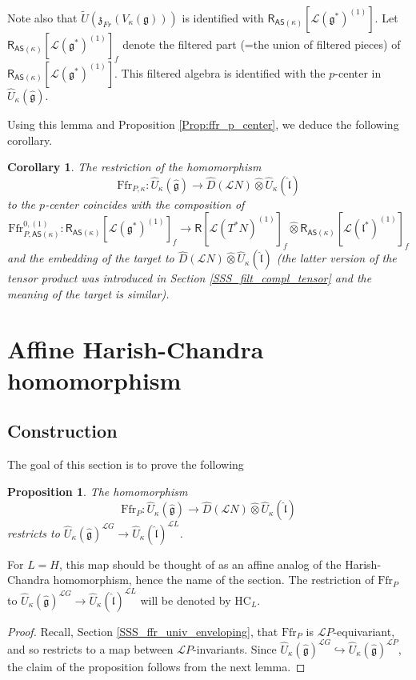 \documentclass{amsart}
\newtheorem{Prop}[Thm]{Proposition}
\newtheorem{Cor}[Thm]{Corollary}
\theoremstyle{definition}
\newcommand{\Ring}{\mathsf{R}}
\newcommand{\g}{\mathfrak{g}}
\newcommand{\HC}{\mathrm{HC}} %
\newcommand{\lf}{\mathfrak{l}}
\newcommand{\Loop}{\mathscr{L}}
\newcommand{\AS}{\mathsf{AS}}
\newcommand{\frz}{\mathfrak{z}}
\newcommand{\Ffr}{\mathrm{{Ffr}}}
\numberwithin{equation}{section}
\begin{document}
Note also that $\widetilde{U}(\frz_{Fr}(V_\kappa(\g)))$ is identified 
with $\Ring_{\AS(\kappa)}[\Loop (\g^*)^{(1)}]$. Let
$\Ring_{\AS(\kappa)}[\Loop (\g^*)^{(1)}]_f$ denote the filtered part (=the union of filtered pieces) of $\Ring_{\AS(\kappa)}[\Loop (\g^*)^{(1)}]$. This filtered algebra is identified with the $p$-center in $\widehat{U}_\kappa(\hat{\g})$.

Using this lemma and Proposition \ref{Prop:ffr_p_center}, we deduce the following corollary.

\begin{Cor}\label{Cor:ffr_p_center}
The restriction of the homomorphism $$\Ffr_{P,\kappa}:\widehat{U}_\kappa(\hat{\g})\rightarrow \widehat{D}(\Loop N)\widehat{\otimes} \widehat{U}_\kappa(\hat{\lf})$$ to 
the $p$-center coincides with the composition
of 
$$\Ffr^{0,(1)}_{P,\AS(\kappa)}:\Ring_{\AS(\kappa)}[\Loop (\g^*)^{(1)}]_f\rightarrow \Ring[\Loop (T^*N)^{(1)}]_f\widehat{\otimes} \Ring_{\AS(\kappa)}[\Loop (\lf^*)^{(1)}]_f$$
and the embedding of the target to $\widehat{D}(\Loop N)\widehat{\otimes} \widehat{U}_\kappa(\hat{\lf})$ (the latter version of the tensor product was introduced in Section \ref{SSS_filt_compl_tensor} and the meaning of the target is similar).
\end{Cor}


\section{Affine Harish-Chandra homomorphism}\label{S_affine_HC}
\subsection{Construction}
The goal of this section is to prove the following 
\begin{Prop}\label{Prop:affine_HC}
The homomorphism 
$$\Ffr_P:\widehat{U}_\kappa(\hat{\g})\rightarrow 
\widehat{D}(\Loop N)\widehat{\otimes}\widehat{U}_\kappa(\hat{\lf})$$
restricts to $\widehat{U}_\kappa(\hat{\g})^{\Loop G}\rightarrow 
\widehat{U}_\kappa(\hat{\lf})^{\Loop L}$. 
\end{Prop}

For $L=H$, this map should be thought of as an affine analog of the Harish-Chandra homomorphism, hence the name of the section. The restriction of $\Ffr_P$ to $\widehat{U}_\kappa(\hat{\g})^{\Loop G}\rightarrow 
\widehat{U}_\kappa(\hat{\lf})^{\Loop L}$ will be denoted by $\HC_L$.

\begin{proof}
Recall, Section \ref{SSS_ffr_univ_enveloping}, that $\Ffr_P$ is $\Loop P$-equivariant, and so restricts to a map between $\Loop P$-invariants. Since 
$\widehat{U}_\kappa(\hat{\g})^{\Loop G}\hookrightarrow 
\widehat{U}_\kappa(\hat{\g})^{\Loop P}$, the claim of the proposition follows from the next lemma. 
\end{proof}
\end{document}
